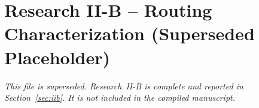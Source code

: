 \section{Research II-B -- Routing Characterization (Superseded Placeholder)}
\label{sec:iib-placeholder-superseded}

\textit{This file is superseded. Research~II-B is complete and reported in
Section~\ref{sec:iib}. It is not included in the compiled manuscript.}
